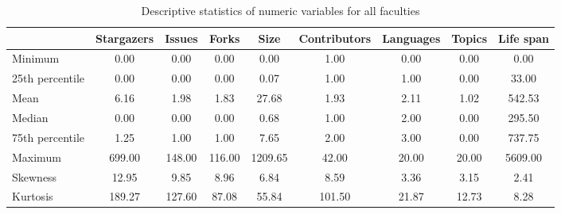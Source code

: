 \begin{table}
\centering
\caption{Descriptive statistics of numeric variables for all faculties}
\label{tab:all_faculties}
\begin{tabular}{lcccccccc}
\toprule
{} &  Stargazers &  Issues &   Forks &     Size &  Contributors &  Languages &  Topics &  Life span \\
\midrule
Minimum         &        0.00 &    0.00 &    0.00 &     0.00 &          1.00 &       0.00 &    0.00 &       0.00 \\
25th percentile &        0.00 &    0.00 &    0.00 &     0.07 &          1.00 &       1.00 &    0.00 &      33.00 \\
Mean            &        6.16 &    1.98 &    1.83 &    27.68 &          1.93 &       2.11 &    1.02 &     542.53 \\
Median          &        0.00 &    0.00 &    0.00 &     0.68 &          1.00 &       2.00 &    0.00 &     295.50 \\
75th percentile &        1.25 &    1.00 &    1.00 &     7.65 &          2.00 &       3.00 &    0.00 &     737.75 \\
Maximum         &      699.00 &  148.00 &  116.00 &  1209.65 &         42.00 &      20.00 &   20.00 &    5609.00 \\
Skewness        &       12.95 &    9.85 &    8.96 &     6.84 &          8.59 &       3.36 &    3.15 &       2.41 \\
Kurtosis        &      189.27 &  127.60 &   87.08 &    55.84 &        101.50 &      21.87 &   12.73 &       8.28 \\
\bottomrule
\end{tabular}
\end{table}
